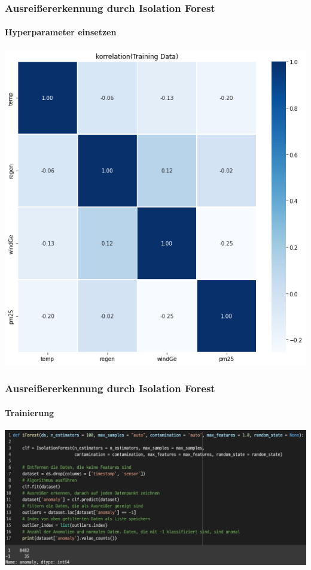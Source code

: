 \documentclass{beamer}
\begin{document}
    \begin{frame}
        \frametitle{Ausreißererkennung durch Isolation Forest}
        \framesubtitle{Hyperparameter einsetzen}
        \centering
        \includegraphics[scale=0.37]{korrelation.png}
    \end{frame}
    
    \begin{frame}
        \frametitle{Ausreißererkennung durch Isolation Forest}
        \framesubtitle{Trainierung}
        \centering
        \includegraphics[scale=0.35]{training.png}
    \end{frame}
    
\end{document}
